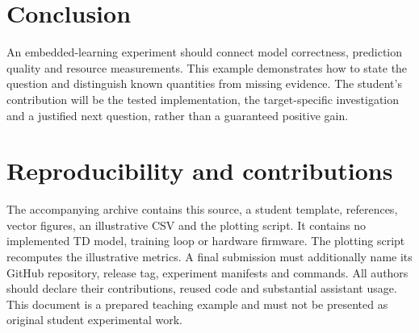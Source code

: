 \documentclass[preprint,11pt,a4paper]{elsarticle}
\begin{document}
\section{Conclusion}
An embedded-learning experiment should connect model correctness, prediction quality and resource measurements. This example demonstrates how to state the question and distinguish known quantities from missing evidence. The student's contribution will be the tested implementation, the target-specific investigation and a justified next question, rather than a guaranteed positive gain.

\section*{Reproducibility and contributions}
The accompanying archive contains this source, a student template, references, vector figures, an illustrative CSV and the plotting script. It contains no implemented TD model, training loop or hardware firmware. The plotting script recomputes the illustrative metrics. A final submission must additionally name its GitHub repository, release tag, experiment manifests and commands. All authors should declare their contributions, reused code and substantial assistant usage. This document is a prepared teaching example and must not be presented as original student experimental work.



\end{document}
